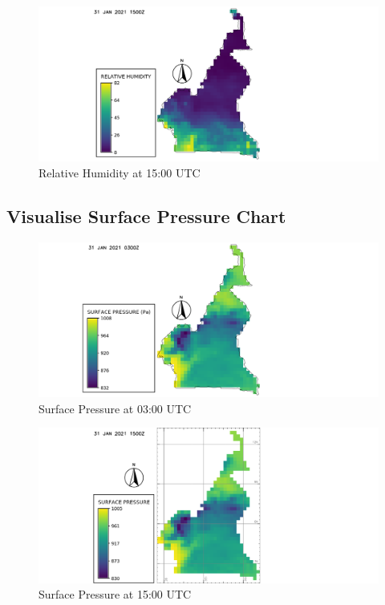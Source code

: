 \begin{figure}[H]
\begin{center}
\includegraphics[scale=0.4]{rh15.png} %
\end{center}
\caption{Relative Humidity at 15:00 UTC}
\label{Relative Humidity at 15:00 UTC}%
\end{figure}
\newpage
\subsection{Visualise Surface Pressure Chart}
\begin{figure}[H]
\begin{center}
\includegraphics[scale=0.4]{sp03.png} %
\end{center}
\caption{Surface Pressure at 03:00 UTC}
\label{Surface Pressure  at 03:00 UTC}%
\end{figure}

\begin{figure}[H]
\begin{center}
\includegraphics[scale=0.4]{sp15a.png} %
\end{center}
\caption{Surface Pressure  at 15:00 UTC}
\label{Surface Pressure  at 15:00 UTC}%
\end{figure}
\newpage

